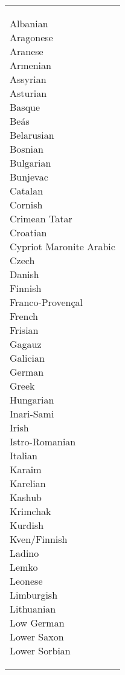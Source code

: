 \documentclass[output=paper]{langscibook}
\begin{document}
\begin{table}
\begin{tabularx}{\textwidth}{l}
\lsptoprule
\parbox{\textwidth}{
\begin{multicols}{4}
Albanian\\
Aragonese\\
Aranese\\
Armenian\\
Assyrian\\
Asturian\\
Basque\\
Beás\\
Belarusian\\
Bosnian\\
Bulgarian\\
Bunjevac\\
Catalan\\
Cornish\\
Crimean Tatar\\
Croatian\\
Cypriot Maronite \hspace*{2mm}Arabic\\
Czech\\
Danish\\
Finnish\\
Franco-Provençal\\
French\\
Frisian\\
Gagauz\\
Galician\\
German\\
Greek\\
Hungarian\\
Inari-Sami\\
Irish\\
Istro-Romanian\\
Italian\\
Karaim\\
Karelian\\
Kashub\\
Krimchak\\
Kurdish\\
Kven/Finnish\\
Ladino\\
Lemko\\
Leonese\\
Limburgish\\
Lithuanian\\
Low German\\
Lower Saxon\\
Lower Sorbian\\

\end{multicols}}
\end{tabularx}
\end{table}
\end{document}
